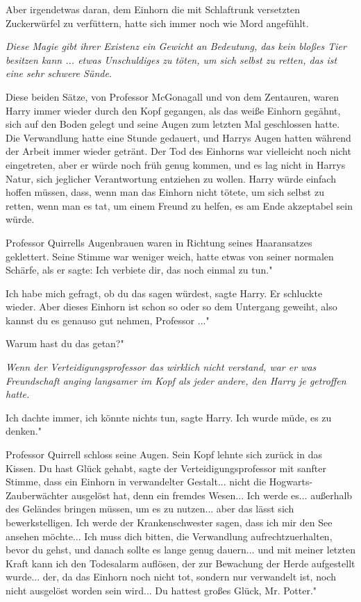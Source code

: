 Aber irgendetwas daran, dem Einhorn die mit Schlaftrunk versetzten Zuckerwürfel
zu verfüttern, hatte sich immer noch wie Mord angefühlt.

\emph{Diese Magie gibt ihrer Existenz ein Gewicht an Bedeutung, das kein bloßes
Tier besitzen kann ... etwas Unschuldiges zu töten, um sich selbst zu retten,
das ist eine sehr schwere Sünde.}

Diese beiden Sätze, von Professor McGonagall und von dem Zentauren, waren Harry
immer wieder durch den Kopf gegangen, als das weiße Einhorn gegähnt, sich auf
den Boden gelegt und seine Augen zum letzten Mal geschlossen hatte. Die
Verwandlung hatte eine Stunde gedauert, und Harrys Augen hatten während der
Arbeit immer wieder getränt. Der Tod des Einhorns war vielleicht noch nicht
eingetreten, aber er würde noch früh genug kommen, und es lag nicht in Harrys
Natur, sich jeglicher Verantwortung entziehen zu wollen. Harry würde einfach
hoffen müssen, dass, wenn man das Einhorn nicht tötete, um sich selbst zu
retten, wenn man es tat, um einem Freund zu helfen, es am Ende akzeptabel sein
würde.

Professor Quirrells Augenbrauen waren in Richtung seines Haaransatzes
geklettert. Seine Stimme war weniger weich, hatte etwas von seiner normalen
Schärfe, als er sagte: \glqq{}Ich verbiete dir, das noch einmal zu tun."

\glqq{}Ich habe mich gefragt, ob du das sagen würdest\grqq{}, sagte Harry. Er
schluckte wieder. \glqq{}Aber dieses Einhorn ist schon so oder so dem Untergang
geweiht, also kannst du es genauso gut nehmen, Professor ..."

\glqq{}Warum hast du das getan?"

\emph{Wenn der Verteidigungsprofessor das wirklich nicht verstand, war er was
Freundschaft anging langsamer im Kopf als jeder andere, den Harry je getroffen
hatte.}

\glqq{}Ich dachte immer, ich könnte nichts tun\grqq{}, sagte Harry. \glqq{}Ich
wurde müde, es zu denken."

Professor Quirrell schloss seine Augen. Sein Kopf lehnte sich zurück in das
Kissen. \glqq{}Du hast Glück gehabt\grqq{}, sagte der Verteidigungsprofessor mit
sanfter Stimme, \glqq{}dass ein Einhorn in verwandelter Gestalt... nicht die
Hogwarts-Zauberwächter ausgelöst hat, denn ein fremdes Wesen... Ich werde es...
außerhalb des Geländes bringen müssen, um es zu nutzen... aber das lässt sich
bewerkstelligen. Ich werde der Krankenschwester sagen, dass ich mir den See
ansehen möchte... Ich muss dich bitten, die Verwandlung aufrechtzuerhalten,
bevor du gehst, und danach sollte es lange genug dauern... und mit meiner
letzten Kraft kann ich den Todesalarm auflösen, der zur Bewachung der Herde
aufgestellt wurde... der, da das Einhorn noch nicht tot, sondern nur verwandelt
ist, noch nicht ausgelöst worden sein wird... Du hattest großes Glück, Mr.
Potter."

